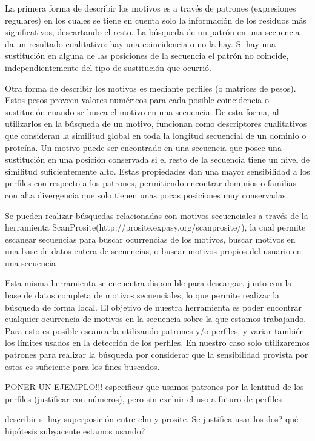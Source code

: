 La primera forma de describir los motivos es a través de patrones (expresiones regulares) en los cuales se tiene en cuenta solo la información de los residuos más significativos, descartando el resto. La búsqueda de un patrón en una secuencia da un resultado cualitativo: hay una coincidencia o no la hay. Si hay una sustitución en alguna de las posiciones de la secuencia el patrón no coincide, independientemente del tipo de sustitución que ocurrió.

Otra forma de describir los motivos es mediante perfiles (o matrices de pesos). Estos pesos proveen valores numéricos para cada posible coincidencia o sustitución cuando se busca el motivo en una secuencia. De esta forma, al utilizarlos en la búsqueda de un motivo, funcionan como descriptores cualitativos que consideran la similitud global en toda la longitud secuencial de un dominio o proteína. Un motivo puede ser encontrado en una secuencia que posee una sustitución en una posición conservada si el resto de la secuencia tiene un nivel de similitud suficientemente alto.
Estas propiedades dan una mayor sensibilidad a los perfiles con respecto a los patrones, permitiendo encontrar dominios o familias con alta divergencia que solo tienen unas pocas posiciones muy conservadas.


Se pueden realizar búsquedas relacionadas con motivos secuenciales a través de la herramienta ScanProsite(http://prosite.expasy.org/scanprosite/), la cual permite escanear secuencias para buscar ocurrencias de los motivos, buscar motivos en una base de datos entera de secuencias, o buscar motivos propios del usuario en una secuencia

Esta misma herramienta se encuentra disponible para descargar, junto con la base de datos completa de motivos secuenciales, lo que permite realizar la búsqueda de forma local.
El objetivo de nuestra herramienta es poder encontrar cualquier ocurrencia de motivos en la secuencia sobre la que estamos trabajando. Para esto es posible escanearla utilizando patrones y/o perfiles, y variar también los límites usados en la detección de los perfiles. En nuestro caso solo utilizaremos patrones para realizar la búsqueda por considerar que la sensibilidad provista por estos es suficiente para los fines buscados.

PONER UN EJEMPLO!!! especificar que usamos patrones por la lentitud de los perfiles (justificar con números), pero sin excluir el uso a futuro de perfiles

describir si hay superposición entre elm y prosite. Se justifica usar los dos? qué hipótesis subyacente estamos usando?

